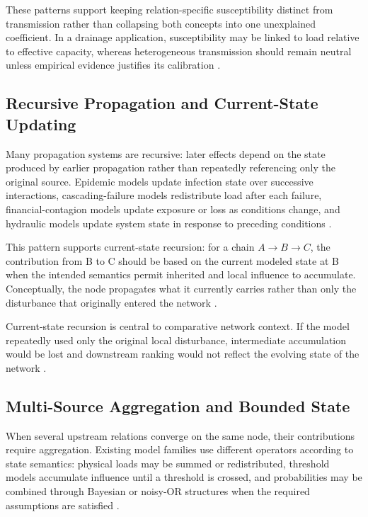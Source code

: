 These patterns support keeping relation-specific susceptibility distinct
from transmission rather than collapsing both concepts into one
unexplained coefficient. In a drainage application, susceptibility may be
linked to load relative to effective capacity, whereas heterogeneous
transmission should remain neutral unless empirical evidence justifies its
calibration \citep{dastgir2023,meijer2023,zhang2025}.

\subsection{Recursive Propagation and Current-State
Updating}\label{recursive-propagation-and-current-state-updating}

Many propagation systems are recursive: later effects depend on the
state produced by earlier propagation rather than repeatedly referencing
only the original source. Epidemic models update infection state over
successive interactions, cascading-failure models redistribute load
after each failure, financial-contagion models update exposure or loss
as conditions change, and hydraulic models update system state in
response to preceding conditions \citep{kermack1927,buldyrev2010,
he2019,faraji2026,petrone2018}.

This pattern supports current-state recursion: for a chain
$A\to B\to C$, the contribution from B to C should be based on the current
modeled state at B when the intended semantics permit inherited and local
influence to accumulate. Conceptually, the node propagates what it
currently carries rather than only the disturbance that originally
entered the network \citep{kermack1927,buldyrev2010,faraji2026}.

Current-state recursion is central to comparative network context. If
the model repeatedly used only the original local disturbance,
intermediate accumulation would be lost and downstream ranking would not
reflect the evolving state of the network \citep{kempe2003,buldyrev2010,
petrone2018}.

\subsection{Multi-Source Aggregation and Bounded
State}\label{multi-source-aggregation-and-bounded-state}

When several upstream relations converge on the same node, their
contributions require aggregation. Existing model families use different
operators according to state semantics: physical loads may be summed or
redistributed, threshold models accumulate influence until a threshold
is crossed, and probabilities may be combined through Bayesian or
noisy-OR structures when the required assumptions are satisfied
\citep{kempe2003,munoz2017,buldyrev2010}.

